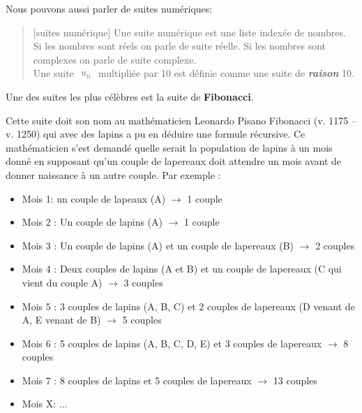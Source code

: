 \documentclass[french,11pt]{report}
\begin{document}
Nous pouvons aussi parler de suites numériques:

\begin{quote}[suites numérique]
  Une suite numérique est une liste indexée de nombres.\\ 
  Si les nombres sont réels on parle de suite réelle. 
  Si les nombres sont complexes on parle de suite complexe.\\
  Une suite   
  $
  \begin{array}{rcl}
   u_n
  \end{array}
  $ multipliée par 10 est définie comme une suite de \textbf{\textit{raison}} 10.
\end{quote}


Une des suites les plus célèbres est la suite de \textbf{Fibonacci}.

Cette suite doit son nom au mathématicien Leonardo Pisano Fibonacci (v. 1175 – v. 1250) qui avec des lapins a pu en déduire une formule récursive.  Ce mathématicien s’est demandé quelle serait la population de lapins à un mois donné en supposant qu’un couple de lapereaux doit attendre un mois avant de donner naissance à un autre couple. Par exemple :

\begin{itemize}
    \item Mois 1: un couple de lapeaux (A) \begin{math}\rightarrow\end{math} 1 couple
    \item Mois 2 : Un couple de lapins (A) \begin{math}\rightarrow\end{math} 1 couple
	\item Mois 3 : Un couple de lapins (A) et un couple de lapereaux (B) \begin{math}\rightarrow\end{math} 2 couples
	\item Mois 4 : Deux couples de lapins (A et B) et un couple de lapereaux (C qui vient du couple A) \begin{math}\rightarrow\end{math} 3 couples
	\item Mois 5 : 3 couples de lapins (A, B, C) et 2 couples de lapereaux (D venant de A, E venant de B) \begin{math}\rightarrow\end{math} 5 couples
	\item Mois 6 : 5 couples de lapins (A, B, C, D, E) et 3 couples de lapereaux \begin{math}\rightarrow\end{math} 8 couples
	\item Mois 7 : 8 couples de lapins et 5 couples de lapereaux \begin{math}\rightarrow\end{math} 13 couples
	\item Mois X: ... \\
\end{itemize} 
\end{document}
